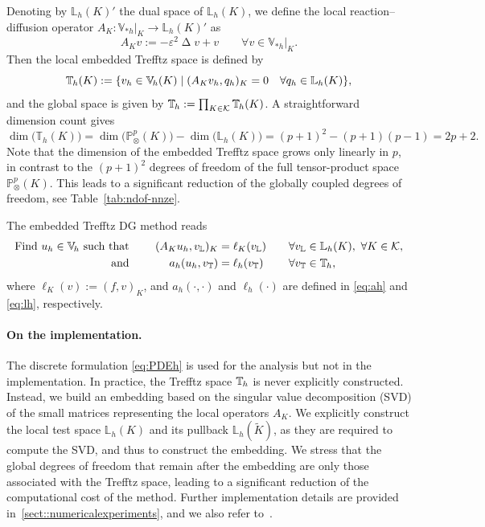 \documentclass[a4paper,twoside,10pt]{article}
\newenvironment{eqs} %
 { \begin{equation} \begin{aligned} } %
 { \end{aligned} \end{equation} \ignorespacesafterend } %
\newcommand{\Vsh}{V_{\!\star \hspace*{-0.2mm}h}}
\newcommand{\AK}{{A_K}}
\newcommand{\LKh}{\mathbb{L}_h(K)}
\DeclareMathOperator{\Lap}{\Delta}
\renewcommand{\dim}{\operatorname{dim}}
\newcommand{\eps}{\varepsilon}
\newcommand{\inner}[1]{( #1 )}
\newcommand{\IL}{\mathbb{L}}
\newcommand{\IP}{\mathbb{P}}
\newcommand{\IT}{\mathbb{T}}
\newcommand{\calK}{\mathcal{K}}
\numberwithin{equation}{section}
\newcommand{\Vh}{\mathbb{V}_{\! h}}
\newcommand{\ITh}{\mathbb{T}_{\mspace{-1.5mu} h}}
\renewcommand{\Vsh}{\mathbb{V}_{*h}}
\newcommand{\Kt}{\widetilde{K}}
\begin{document}
Denoting by $\LKh'$ 
the dual space of $\LKh$, we define the local reaction--diffusion operator $\AK : \Vsh|_K \to \LKh'$ as
	\begin{equation*}
		A_K v := -\eps^2 \Lap v +v \qquad \forall v \in \Vsh|_K .
	\end{equation*}
	Then the local embedded Trefftz space is defined by
	\begin{equation*} 
	    \ITh(K) : = \{v_h \in \Vh(K) \mid (\AK v_h, q_h)_{K}=0 \quad \forall q_h\in \LKh\},
	\end{equation*}
	and the global space is given by $\ITh:= \prod_{K \in \calK} \ITh(K)$.
		A straightforward dimension count gives
		\begin{equation*}
			\dim\big(\IT_h(K)\big)=\dim\big(\IP^p_{\otimes}(K)\big)-\dim\big(\IL_h(K)\big)=(p+1)^2-(p+1)(p-1)=2p+2.
		\end{equation*}
		Note that the dimension of the embedded Trefftz space grows only linearly 
		in $p$, in contrast to the $(p+1)^2$ degrees of freedom of the full 
		tensor-product space $\IP^p_\otimes(K)$. This leads to a significant reduction of the globally coupled 
		degrees of freedom, see Table~\ref{tab:ndof-nnze}.
	
	The embedded Trefftz DG method reads
	\begin{eqs}\label{eq:PDEh}
	    \text{Find } u_h \in \Vh
	    \text{ such that } &&\quad\inner{\AK  u_h, v_\IL}_{K}&=\ell_K(v_\IL) &&\quad \forall v_\IL\in \IL_h(K), \ \forall K\in\calK,
	 \\ \text{ and }  && \quad a_h(u_h,v_\IT)&=\ell_h(v_\IT) &&\quad \forall v_\IT \in \ITh,
	\end{eqs}
	where $\ell_K(v):=(f,v)_{K}$, and $a_h(\cdot, \cdot)$ and $\ell_h(\cdot)$ are defined in \eqref{eq:ah} and \eqref{eq:lh}, respectively.
	
	\paragraph{On the implementation.}
	The discrete formulation \eqref{eq:PDEh} is used for the analysis but not in the implementation.
	In practice, the Trefftz space $\ITh$ is never explicitly constructed. 
	Instead, we build an embedding based on the singular value decomposition (SVD) of the small matrices representing the local operators $A_K$. We explicitly construct the local test space $\LKh$ and its pullback $\IL_h(\Kt)$, as they are required to compute the SVD, and thus to construct the embedding.
	We stress that the global degrees of freedom that remain after the embedding are only those associated with 
    the Trefftz space, leading to a significant reduction of the computational cost of the method.
	Further implementation details are provided in~\cref{sect::numericalexperiments}, and we also refer to~\cite{LS_IJMNE_2023}.
	
\end{document}

